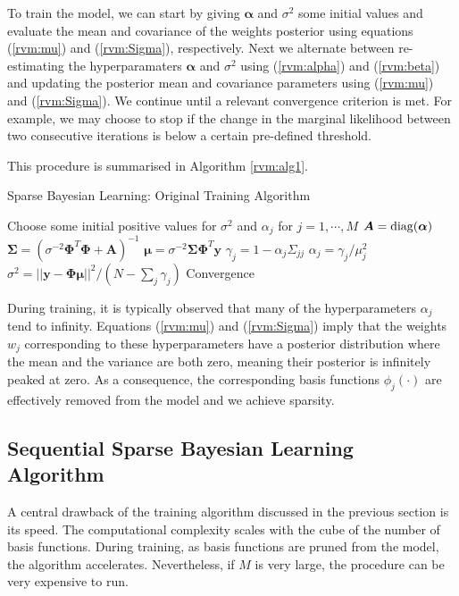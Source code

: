 To train the model, we can start by giving $\bm\alpha$ and $\sigma^2$ some initial values and evaluate the mean and covariance of the weights posterior using equations (\ref{rvm:mu}) and (\ref{rvm:Sigma}), respectively.
Next we alternate between re-estimating the hyperparamaters $\bm\alpha$ and $\sigma^2$ using (\ref{rvm:alpha}) and (\ref{rvm:beta}) and updating the posterior mean and covariance parameters using (\ref{rvm:mu}) and (\ref{rvm:Sigma}).
We continue until a relevant convergence criterion is met.
For example, we may choose to stop if the change in the marginal likelihood between two consecutive iterations is below a certain pre-defined threshold.

This procedure is summarised in Algorithm \ref{rvm:alg1}.
\begin{algorithm}
  \caption{Sparse Bayesian Learning: Original Training Algorithm}
  \label{rvm:alg1}
  \begin{algorithmic}[1]
    \State Choose some initial positive values for $\sigma^2$ and $\alpha_j$ for $j=1,\cdots,M$ 
    \Repeat
    \State $\bm A = \operatorname*{diag}(\bm\alpha)$
    \State $\bm\Sigma = \left(\sigma^{-2}\bm\Phi^T\bm\Phi + \bm A\right)^{-1}$
    \State $\bm\mu = \sigma^{-2}\bm\Sigma\bm\Phi^T\bm y$
    \Statex
    \State $\gamma_j = 1 - \alpha_j \Sigma_{jj}$
    \State $\alpha_j = \gamma_j/\mu_j^2$
    \EndFor
    \State $\sigma^2 =||\bm y - \bm\Phi\bm\mu||^2 / (N - \sum_j\gamma_j)$
    \Until Convergence
  \end{algorithmic}
\end{algorithm}

During training, it is typically observed that many of the hyperparameters $\alpha_j$ tend to infinity.
Equations (\ref{rvm:mu}) and (\ref{rvm:Sigma}) imply that the weights $w_j$ corresponding to these hyperparameters have a posterior distribution where the mean and the variance are both zero, meaning their posterior is infinitely peaked at zero.
As a consequence, the corresponding basis functions $\phi_j(\cdot)$ are effectively removed from the model and we achieve sparsity.

\subsection{Sequential Sparse Bayesian Learning Algorithm}
\label{sect:ssbl}
A central drawback of the training algorithm discussed in the previous section is its speed. 
The computational complexity scales with the cube of the number of basis functions.
During training, as basis functions are pruned from the model, the algorithm accelerates.
Nevertheless, if $M$ is very large, the procedure can be very expensive to run.

